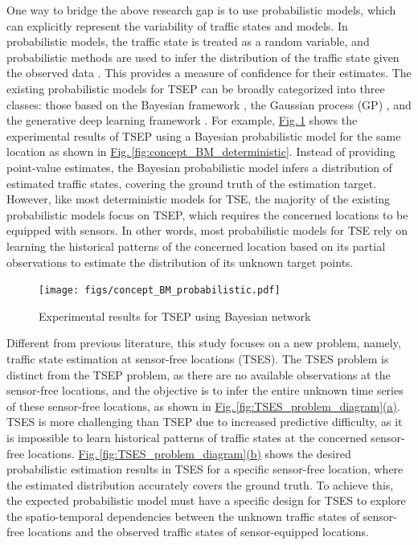 \documentclass[a4paper,fleqn,12pt]{cas-sc}
\newcommand{\rev}[1]{{\color{red} #1}}
\begin{document}
One way to bridge the above research gap is to use probabilistic models, which can explicitly represent the variability of traffic states and models. In probabilistic models, the traffic state is treated as a random variable, and probabilistic methods are used to infer the distribution of the traffic state given the observed data \citep{gu2016probabilistic}. This provides a measure of confidence for their estimates. The existing probabilistic models for TSEP can be broadly categorized into three classes: those based on the Bayesian framework \citep{2019Probabilistic}, the Gaussian process (GP) \citep{2017Road}, and the generative deep learning framework \citep{shi2021physicsinformed}. For example, \hyperref[fig:concept_BM_probabilistic]{Fig.\,\ref{fig:concept_BM_probabilistic}} shows the experimental results of TSEP using a Bayesian probabilistic model for the same location as shown in \hyperref[fig:concept_BM_deterministic]{Fig.\,\ref{fig:concept_BM_deterministic}}. Instead of providing point-value estimates, the Bayesian probabilistic model infers a distribution of estimated traffic states, covering the ground truth of the estimation target. However, like most deterministic models for TSE, the majority of the existing probabilistic models focus on TSEP, which requires the concerned locations to be equipped with sensors. In other words, most probabilistic models for TSE rely on learning the historical patterns of the concerned location based on its partial observations to estimate the distribution of its unknown target points. 

\begin{figure}[pos=htbp,width=10.5cm,align=\centering]
  \centering 
  \texttt{[image: figs/concept\_BM\_probabilistic.pdf]}
  \caption{Experimental results for TSEP using Bayesian network}\label{fig:concept_BM_probabilistic}
\end{figure}

\rev{Different from previous literature, this study focuses on a new problem, namely, traffic state estimation at sensor-free locations (TSES). The TSES problem is distinct from the TSEP problem, as there are no available observations at the sensor-free locations, and the objective is to infer the entire unknown time series of these sensor-free locations, as shown in \hyperref[fig:TSES_problem_diagram]{Fig.\,\ref{fig:TSES_problem_diagram}(a)}.  TSES is more challenging than TSEP due to increased predictive difficulty, as it is impossible to learn historical patterns of traffic states at the concerned sensor-free locations. \hyperref[fig:TSES_problem_diagram]{Fig.\,\ref{fig:TSES_problem_diagram}(b)} shows the desired probabilistic estimation results in TSES for a specific sensor-free location, where the estimated distribution accurately covers the ground truth.} To achieve this, the expected probabilistic model must have a specific design for TSES to explore the spatio-temporal dependencies between the unknown traffic states of sensor-free locations and the observed traffic states of sensor-equipped locations. 
\end{document}
